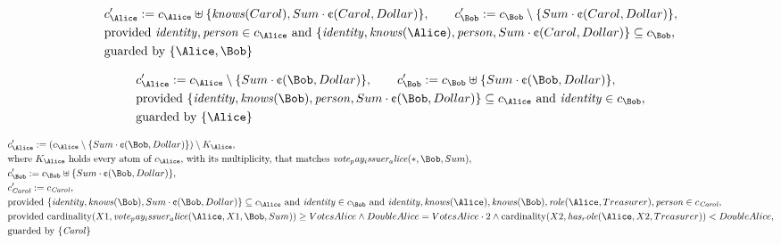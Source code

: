 \begin{align*}
&
c'_
{
\Alice
}
 := 
c_
{
\Alice
}
 \uplus 
\{
\mathit{
knows
}
(
Carol
)
,
Sum
\cdot
\text{\textcent}
(
Carol
,
Dollar
)
\}
, \qquad 
c'_
{
\Bob
}
 := 
c_
{
\Bob
}
 \setminus 
\{
Sum
\cdot
\text{\textcent}
(
Carol
,
Dollar
)
\}
,\\
&
\text{provided } 
\mathit{
identity
}
,
\mathit{
person
}
 \in c_
{
\Alice
}
 \text{ and } 
\{
\mathit{
identity
}
,
\mathit{
knows
}
(
\Alice
)
,
\mathit{
person
}
,
Sum
\cdot
\text{\textcent}
(
Carol
,
Dollar
)
\}
 \subseteq c_
{
\Bob
}
,\\
&
\text{guarded by } \{
\Alice
,
\Bob
\}
\end{align*}

\begin{align*}
&
c'_
{
\Alice
}
 := 
c_
{
\Alice
}
 \setminus 
\{
Sum
\cdot
\text{\textcent}
(
\Bob
,
Dollar
)
\}
, \qquad 
c'_
{
\Bob
}
 := 
c_
{
\Bob
}
 \uplus 
\{
Sum
\cdot
\text{\textcent}
(
\Bob
,
Dollar
)
\}
,\\
&
\text{provided } 
\{
\mathit{
identity
}
,
\mathit{
knows
}
(
\Bob
)
,
\mathit{
person
}
,
Sum
\cdot
\text{\textcent}
(
\Bob
,
Dollar
)
\}
 \subseteq c_
{
\Alice
}
 \text{ and } 
\mathit{
identity
}
 \in c_
{
\Bob
}
,\\
&
\text{guarded by } \{
\Alice
\}
\end{align*}

\begin{align*}
&
c'_
{
\Alice
}
 := 
(c_
{
\Alice
}
 \setminus 
\{
Sum
\cdot
\text{\textcent}
(
\Bob
,
Dollar
)
\}
) \setminus K_
{
\Alice
}
,\\
&
\text{where } K_
{
\Alice
}
 \text{ holds every atom of } c_
{
\Alice
}
 \text{, with its multiplicity, that matches } 
\mathit{
vote_pay_issuer_alice
}
(
\ast
,
\Bob
,
Sum
)
,\\
&
c'_
{
\Bob
}
 := 
c_
{
\Bob
}
 \uplus 
\{
Sum
\cdot
\text{\textcent}
(
\Bob
,
Dollar
)
\}
,\\
&
c'_
{
\mathit{Carol}
}
 := 
c_
{
\mathit{Carol}
}
,\\
&
\text{provided } 
\{
\mathit{
identity
}
,
\mathit{
knows
}
(
\Bob
)
,
Sum
\cdot
\text{\textcent}
(
\Bob
,
Dollar
)
\}
 \subseteq c_
{
\Alice
}
 \text{ and } 
\mathit{
identity
}
 \in c_
{
\Bob
}
 \text{ and } 
\mathit{
identity
}
,
\mathit{
knows
}
(
\Alice
)
,
\mathit{
knows
}
(
\Bob
)
,
\mathit{
role
}
(
\Alice
,
Treasurer
)
,
\mathit{
person
}
 \in c_
{
\mathit{Carol}
}
,\\
&
\text{provided } 
\mathrm{cardinality}(
X1
,
\mathit{
vote_pay_issuer_alice
}
(
\Alice
,
X1
,
\Bob
,
Sum
)
)
\ge
VotesAlice
\land
DoubleAlice
=
VotesAlice
\cdot
2
\land
\mathrm{cardinality}(
X2
,
\mathit{
has_role
}
(
\Alice
,
X2
,
Treasurer
)
)
<
DoubleAlice
,\\
&
\text{guarded by } \{
\mathit{Carol}
\}
\end{align*}
